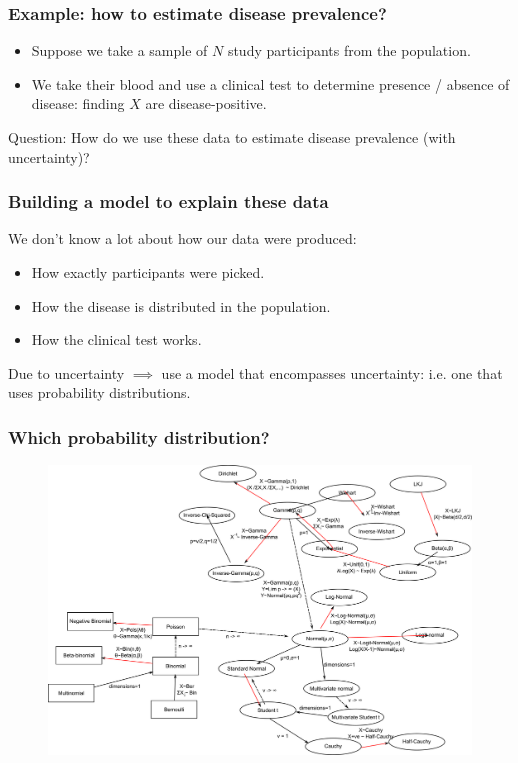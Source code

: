 \documentclass[handout]{beamer}
\begin{document}
\begin{frame}
	\frametitle{Example: how to estimate disease prevalence?}
	
	\begin{itemize}
		\item Suppose we take a sample of $N$ study participants from the population.
		\item We take their blood and use a clinical test to determine presence / absence of disease: finding $X$ are disease-positive.
	\end{itemize}
	
	Question: How do we use these data to estimate disease prevalence (with uncertainty)?
	
\end{frame}

\begin{frame}
	\frametitle{Building a model to explain these data}
	
	We don't know a lot about how our data were produced:
	
	\begin{itemize}
	\item How exactly participants were picked.
	\item How the disease is distributed in the population.
	\item How the clinical test works.
	\end{itemize}
	
	Due to uncertainty $\implies$ use a model that encompasses uncertainty: i.e. one that uses probability distributions.
	
\end{frame}

\begin{frame}
	\frametitle{Which probability distribution?}
	
		\begin{figure}[h]
			\centerline{\includegraphics[width=1\textwidth]{animations_figures/Distributions_nexusOfRelations.pdf}}
		\end{figure}
	
\end{frame}
\end{document}
